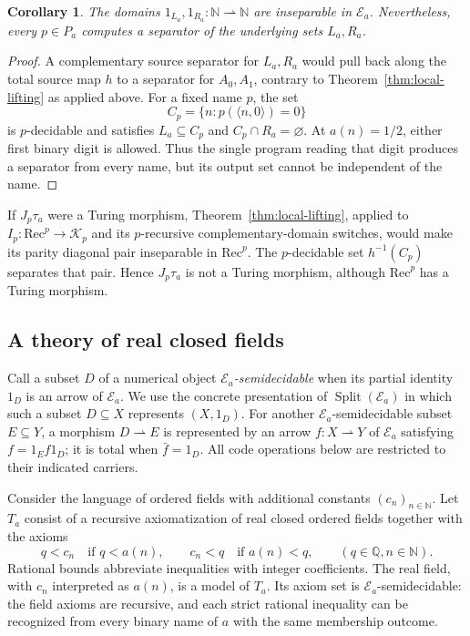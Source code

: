 \documentclass[11pt]{article}
\newtheorem{corollary}[theorem]{Corollary}
\newcommand{\N}{\mathbb N}
\begin{document}
\begin{corollary}\label{cor:miller-cuts-inseparable}
The domains $1_{L_a},1_{R_a}:\N\rightharpoonup\N$ are inseparable in
$\mathcal E_a$. Nevertheless, every $p\in P_a$ computes a separator
of the underlying sets $L_a,R_a$.
\end{corollary}
\begin{proof}
A complementary source separator for $L_a,R_a$ would pull back along
the total source map $h$ to a separator for $A_0,A_1$, contrary to
Theorem~\ref{thm:local-lifting} as applied above.
For a fixed name $p$, the set
\[
 C_p=\{n:p(\langle n,0\rangle)=0\}
\]
is $p$-decidable and satisfies $L_a\subseteq C_p$ and
$C_p\cap R_a=\varnothing$. At $a(n)=1/2$, either first binary digit
is allowed. Thus the single program reading that digit produces a
separator from every name, but its output set cannot be independent
of the name.
\end{proof}

If $J_p\tau_a$ were a Turing morphism, Theorem~\ref{thm:local-lifting},
applied to $I_p:\mathrm{Rec}^{p}\to\mathcal K_p$ and its
$p$-recursive complementary-domain switches, would make its parity
diagonal pair inseparable in $\mathrm{Rec}^{p}$. The $p$-decidable set
$h^{-1}(C_p)$ separates that pair. Hence $J_p\tau_a$ is not a Turing
morphism, although $\mathrm{Rec}^{p}$ has a Turing morphism.


\subsection{A theory of real closed fields}
\label{def:miller-splitting}

Call a subset $D$ of a numerical object \emph{$\mathcal E_a$-semidecidable}
when its partial identity $1_D$ is an arrow of $\mathcal E_a$.
We use the concrete presentation of $\operatorname{Split}(\mathcal E_a)$
in which such a subset $D\subseteq X$ represents $(X,1_D)$.
For another $\mathcal E_a$-semidecidable subset $E\subseteq Y$,
a morphism $D\rightharpoonup E$ is represented by
an arrow $f:X\rightharpoonup Y$ of $\mathcal E_a$ satisfying
$f=1_Ef1_D$; it is total when $\bar f=1_D$.
All code operations below are restricted to their indicated carriers.

Consider the language of ordered fields with additional constants
$(c_n)_{n\in\N}$. Let $T_a$ consist of a recursive axiomatization of
real closed ordered fields together with the axioms
\begin{equation}\label{eq:miller-theory}
 q<c_n\quad\text{if }q<a(n),\qquad
 c_n<q\quad\text{if }a(n)<q,
 \qquad(q\in\mathbb Q, n\in\N).
\end{equation}
Rational bounds abbreviate inequalities with integer coefficients.
The real field, with $c_n$ interpreted as $a(n)$, is a model of $T_a$.
Its axiom set is $\mathcal E_a$-semidecidable: the field axioms are
recursive, and each strict rational inequality can be recognized from
every binary name of $a$ with the same membership outcome.
\end{document}

